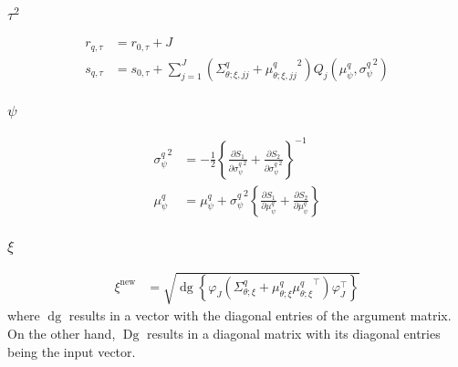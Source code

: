 \documentclass[11pt]{article}
\newcommand{\opn}{\operatorname}
\begin{document}
\subsubsection{$\tau^{2}$}
\begin{align*}
  r_{q,\tau} &= r_{0,\tau} + J\\
  s_{q,\tau} &= s_{0,\tau} + \sum_{j=1}^{J}\left(\Sigma_{\theta;\xi,jj}^{q} + {\mu_{\theta;\xi,jj}^{q}}^{2}\right)Q_{j}\left(\mu_{\psi}^{q},{\sigma_{\psi}^{q}}^{2}\right)
\end{align*}
\subsubsection{$\psi$}
\begin{align*}
  {\sigma_{\psi}^{q}}^{2} &= -\frac{1}{2}\left\{\frac{\partial S_{1}}{\partial {\sigma_{\psi}^{q}}^{2}} +\frac{\partial S_{2}}{\partial {\sigma_{\psi}^{q}}^{2}}  \right\}^{-1}\\
  \mu_{\psi}^{q} &= \mu_{\psi}^{q} + {\sigma_{\psi}^{q}}^{2}\left\{\frac{\partial S_{1}}{\partial \mu_{\psi}^{q}} + \frac{\partial S_{2}}{\partial \mu_{\psi}^{q}}\right\}
\end{align*}
\subsubsection{$\xi$}
\begin{align*}
  \xi^{\text{new}} &= \sqrt{\opn{dg}\left\{\varphi_{J}\left(\Sigma_{\theta;\xi}^{q}+\mu_{\theta;\xi}^{q}{\mu_{\theta;\xi}^{q}}^{\top}\right)\varphi_{J}^{\top} \right\}}
\end{align*}
where $\opn{dg}$ results in a vector with the diagonal entries of the argument matrix. On the other hand, $\opn{Dg}$ results in a diagonal matrix with its diagonal entries being the input vector.
\end{document}
